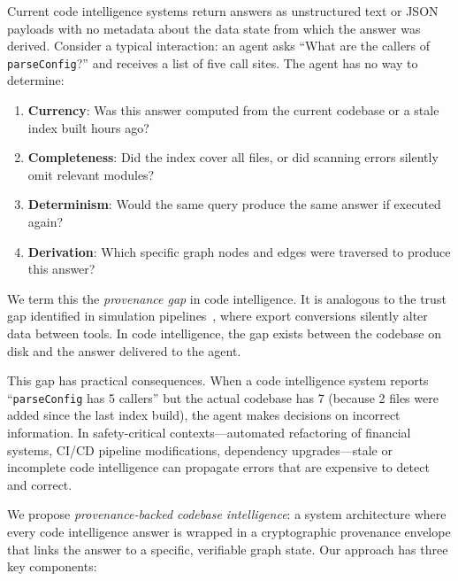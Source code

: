 \documentclass[conference]{IEEEtran}
\begin{document}
Current code intelligence systems return answers as unstructured text or
JSON payloads with no metadata about the data state from which the answer
was derived. Consider a typical interaction: an agent asks ``What are the
callers of \texttt{parseConfig}?'' and receives a list of five call
sites. The agent has no way to determine:

\begin{enumerate}
  \item \textbf{Currency}: Was this answer computed from the current
    codebase or a stale index built hours ago?
  \item \textbf{Completeness}: Did the index cover all files, or did
    scanning errors silently omit relevant modules?
  \item \textbf{Determinism}: Would the same query produce the same
    answer if executed again?
  \item \textbf{Derivation}: Which specific graph nodes and edges were
    traversed to produce this answer?
\end{enumerate}

We term this the \emph{provenance gap} in code intelligence. It is
analogous to the trust gap identified in simulation
pipelines~\cite{Krzywoszyja2026TBC}, where export conversions silently
alter data between tools. In code intelligence, the gap exists between
the codebase on disk and the answer delivered to the agent.

This gap has practical consequences. When a code intelligence system
reports ``\texttt{parseConfig} has 5 callers'' but the actual codebase
has 7 (because 2 files were added since the last index build), the agent
makes decisions on incorrect information. In safety-critical contexts---automated
refactoring of financial systems, CI/CD pipeline modifications,
dependency upgrades---stale or incomplete code intelligence can
propagate errors that are expensive to detect and correct.

We propose \emph{provenance-backed codebase intelligence}: a system
architecture where every code intelligence answer is wrapped in a
cryptographic provenance envelope that links the answer to a specific,
verifiable graph state. Our approach has three key components:
\end{document}
